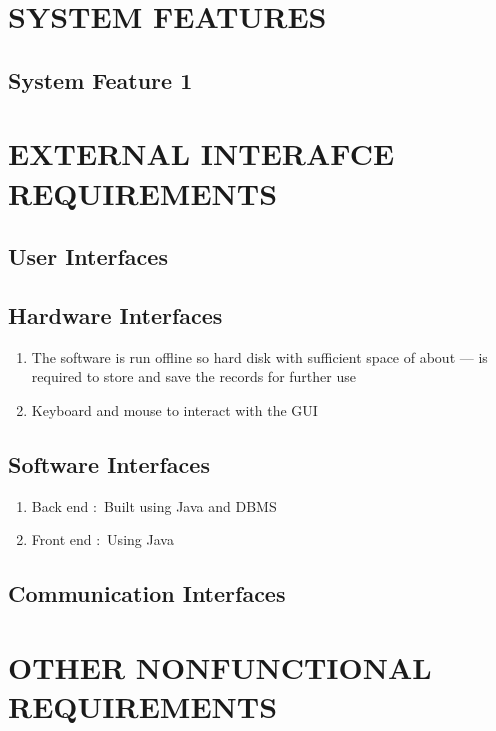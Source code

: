 \documentclass{article}
\begin{document}
\section{SYSTEM FEATURES}
\subsection{System Feature 1}

\section{EXTERNAL INTERAFCE REQUIREMENTS}
\subsection{User Interfaces}
\subsection{Hardware Interfaces}
\begin{enumerate}
\item The software is run offline so hard disk with sufficient space of about --- is required to store and save the records for further use
\item Keyboard and mouse to interact with the GUI
\end{enumerate}
\subsection{Software Interfaces}
\begin{enumerate}
\item Back end  $:$ Built using Java and DBMS
\item Front end $:$ Using Java 
\end{enumerate}

\subsection{Communication Interfaces}

\section{OTHER NONFUNCTIONAL REQUIREMENTS}
\end{document}
